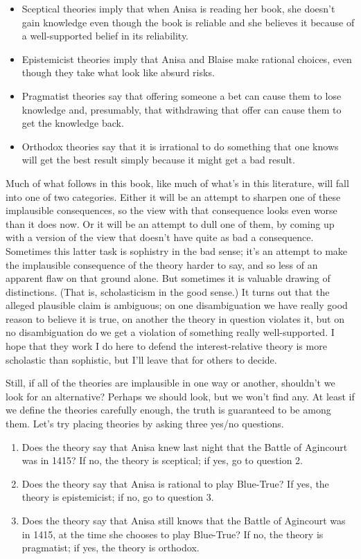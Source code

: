 \documentclass[11pt,]{book}
\providecommand{\tightlist}{%
  \setlength{\itemsep}{0pt}\setlength{\parskip}{0pt}}
\begin{document}
\begin{itemize}
\tightlist
\item
  Sceptical theories imply that when Anisa is reading her book, she doesn't gain knowledge even though the book is reliable and she believes it because of a well-supported belief in its reliability.
\item
  Epistemicist theories imply that Anisa and Blaise make rational choices, even though they take what look like absurd risks.
\item
  Pragmatist theories say that offering someone a bet can cause them to lose knowledge and, presumably, that withdrawing that offer can cause them to get the knowledge back.
\item
  Orthodox theories say that it is irrational to do something that one knows will get the best result simply because it might get a bad result.
\end{itemize}

Much of what follows in this book, like much of what's in this literature, will fall into one of two categories. Either it will be an attempt to sharpen one of these implausible consequences, so the view with that consequence looks even worse than it does now. Or it will be an attempt to dull one of them, by coming up with a version of the view that doesn't have quite as bad a consequence. Sometimes this latter task is sophistry in the bad sense; it's an attempt to make the implausible consequence of the theory harder to say, and so less of an apparent flaw on that ground alone. But sometimes it is valuable drawing of distinctions. (That is, scholasticism in the good sense.) It turns out that the alleged plausible claim is ambiguous; on one disambiguation we have really good reason to believe it is true, on another the theory in question violates it, but on no disambiguation do we get a violation of something really well-supported. I hope that they work I do here to defend the interest-relative theory is more scholastic than sophistic, but I'll leave that for others to decide.

Still, if all of the theories are implausible in one way or another, shouldn't we look for an alternative? Perhaps we should look, but we won't find any. At least if we define the theories carefully enough, the truth is guaranteed to be among them. Let's try placing theories by asking three yes/no questions.

\begin{enumerate}
\def\labelenumi{\arabic{enumi}.}
\tightlist
\item
  Does the theory say that Anisa knew last night that the Battle of Agincourt was in 1415? If no, the theory is sceptical; if yes, go to question 2.
\item
  Does the theory say that Anisa is rational to play Blue-True? If yes, the theory is epistemicist; if no, go to question 3.
\item
  Does the theory say that Anisa still knows that the Battle of Agincourt was in 1415, at the time she chooses to play Blue-True? If no, the theory is pragmatist; if yes, the theory is orthodox.
\end{enumerate}
\end{document}
